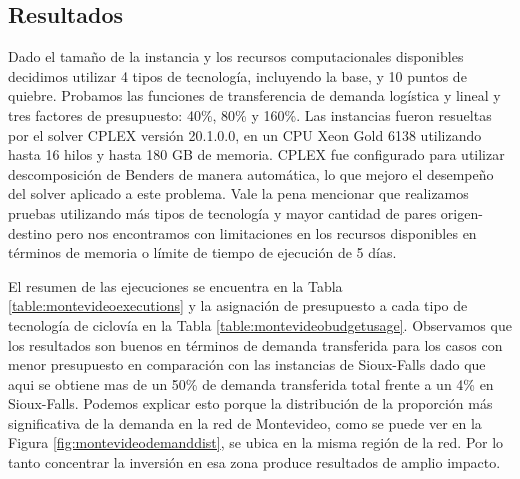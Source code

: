 \subsection{Resultados}

Dado el tamaño de la instancia y los recursos computacionales disponibles decidimos utilizar 4 tipos de tecnología, incluyendo la base, y 10 puntos de quiebre. Probamos las funciones de transferencia de demanda logística y lineal y tres factores de presupuesto: 40\%, 80\% y 160\%. Las instancias fueron resueltas por el solver CPLEX versión 20.1.0.0, en un CPU Xeon Gold 6138 utilizando hasta 16 hilos y hasta 180 GB de memoria. CPLEX fue configurado para utilizar descomposición de Benders de manera automática, lo que mejoro el desempeño del solver aplicado a este problema. Vale la pena mencionar que realizamos pruebas utilizando más tipos de tecnología y mayor cantidad de pares origen-destino pero nos encontramos con limitaciones en los recursos disponibles en términos de memoria o límite de tiempo de ejecución de 5 días.

El resumen de las ejecuciones se encuentra en la Tabla \ref{table:montevideoexecutions} y la asignación de presupuesto a cada tipo de tecnología de ciclovía en la Tabla \ref{table:montevideobudgetusage}. Observamos que los resultados son buenos en términos de demanda transferida para los casos con menor presupuesto en comparación con las instancias de Sioux-Falls dado que aqui se obtiene mas de un 50\% de demanda transferida total frente a un 4\% en Sioux-Falls. Podemos explicar esto porque la distribución de la proporción más significativa de la demanda en la red de Montevideo, como se puede ver en la Figura \ref{fig:montevideodemanddist}, se ubica en la misma región de la red. Por lo tanto concentrar la inversión en esa zona produce resultados de amplio impacto.

